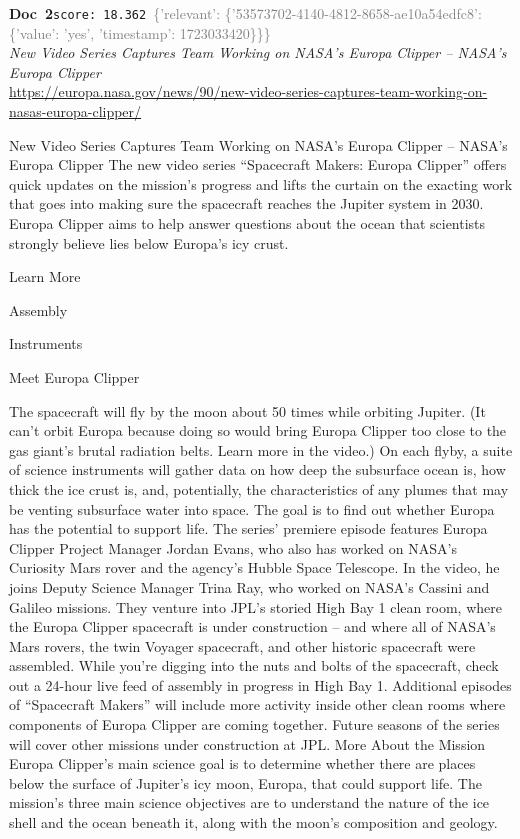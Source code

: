 \documentclass[a4paper,11pt]{article}
\begin{document}
\begin{docenv}
{\footnotesize\textcolor{doccolor}{\textbf{Doc~2}}}\hfill{\tiny\texttt{score:~18.362}}\ {\tiny\textcolor{gray}{\{'relevant': \{'53573702-4140-4812-8658-ae10a54edfc8': \{'value': 'yes', 'timestamp': 1723033420\}\}\}}}\\[3pt]
{\small\textit{New Video Series Captures Team Working on NASA's Europa Clipper – NASA's Europa Clipper}}\\[2pt]
{\tiny\url{https://europa.nasa.gov/news/90/new-video-series-captures-team-working-on-nasas-europa-clipper/}}\\[4pt]
{\footnotesize New Video Series Captures Team Working on NASA's Europa Clipper – NASA's Europa Clipper
The new video series “Spacecraft Makers: Europa Clipper” offers quick updates on the mission’s progress and lifts the curtain on the exacting work that goes into making sure the spacecraft reaches the Jupiter system in 2030. Europa Clipper aims to help answer questions about the ocean that scientists strongly believe lies below Europa’s icy crust.

Learn More

Assembly

Instruments

Meet Europa Clipper

The spacecraft will fly by the moon about 50 times while orbiting Jupiter. (It can’t orbit Europa because doing so would bring Europa Clipper too close to the gas giant’s brutal radiation belts. Learn more in the video.) On each flyby, a suite of science instruments will gather data on how deep the subsurface ocean is, how thick the ice crust is, and, potentially, the characteristics of any plumes that may be venting subsurface water into space. The goal is to find out whether Europa has the potential to support life.
The series’ premiere episode features Europa Clipper Project Manager Jordan Evans, who also has worked on NASA’s Curiosity Mars rover and the agency’s Hubble Space Telescope. In the video, he joins Deputy Science Manager Trina Ray, who worked on NASA’s Cassini and Galileo missions. They venture into JPL’s storied High Bay 1 clean room, where the Europa Clipper spacecraft is under construction – and where all of NASA’s Mars rovers, the twin Voyager spacecraft, and other historic spacecraft were assembled.
While you’re digging into the nuts and bolts of the spacecraft, check out a 24-hour live feed of assembly in progress in High Bay 1.
Additional episodes of “Spacecraft Makers” will include more activity inside other clean rooms where components of Europa Clipper are coming together. Future seasons of the series will cover other missions under construction at JPL.
More About the Mission
Europa Clipper’s main science goal is to determine whether there are places below the surface of Jupiter’s icy moon, Europa, that could support life. The mission’s three main science objectives are to understand the nature of the ice shell and the ocean beneath it, along with the moon’s composition and geology.}
\end{docenv}
\end{document}
